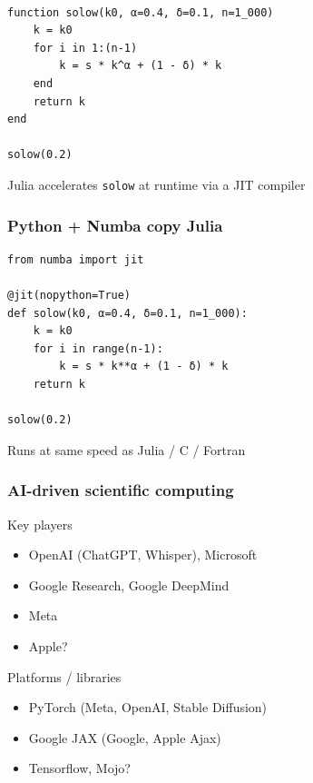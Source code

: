 \documentclass[
    xcolor={svgnames,dvipsnames},
    hyperref={colorlinks, citecolor=DeepPink4, linkcolor=DarkRed, urlcolor=DarkBlue}
    ]{beamer}  %
\newcommand{\1}{\mathbbm 1}
\begin{document}
\begin{frame}[fragile]
    
    \begin{verbatim}

function solow(k0, α=0.4, δ=0.1, n=1_000)
    k = k0
    for i in 1:(n-1)
        k = s * k^α + (1 - δ) * k
    end
    return k
end

solow(0.2)
    \end{verbatim}

    \vspace{0.5em}
    \vspace{0.5em}
    \vspace{0.5em}
    \vspace{0.5em}

    Julia accelerates \texttt{solow} at runtime via a JIT compiler

\end{frame}

\begin{frame}[fragile]
    \frametitle{Python + Numba copy Julia}
    
    \begin{verbatim}
from numba import jit

@jit(nopython=True)
def solow(k0, α=0.4, δ=0.1, n=1_000):
    k = k0
    for i in range(n-1):
        k = s * k**α + (1 - δ) * k
    return k

solow(0.2)
    \end{verbatim}


    Runs at same speed as Julia / C / Fortran

\end{frame}

\begin{frame}
    \frametitle{AI-driven scientific computing}

    Key players
    \begin{itemize}
        \item OpenAI (ChatGPT, Whisper), Microsoft 
        \vspace{0.5em}
        \item Google Research, Google DeepMind
        \vspace{0.5em}
        \item Meta
        \vspace{0.5em}
        \item Apple?
    \end{itemize}

    Platforms / libraries

    \begin{itemize}
        \item PyTorch (Meta, OpenAI, Stable Diffusion)
        \vspace{0.5em}
        \item Google JAX (Google, Apple Ajax)
        \vspace{0.5em}
        \item Tensorflow, Mojo?
    \end{itemize}
    
\end{frame}
\end{document}
